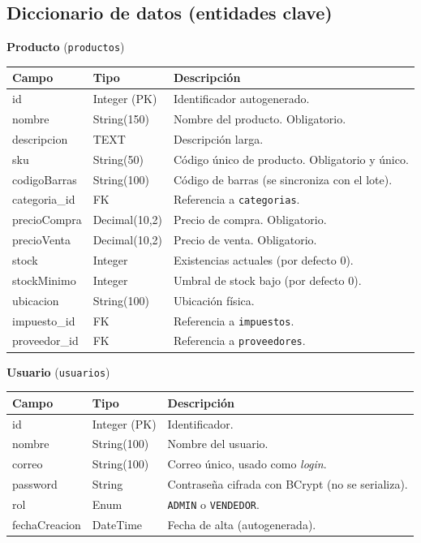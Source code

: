 \documentclass[11pt,a4paper]{article}
\begin{document}
\subsection{Diccionario de datos (entidades clave)}

\textbf{Producto} (\texttt{productos})
\begin{longtable}{>{\ttfamily}p{3.2cm} p{3.5cm} p{7cm}}
\toprule
\textbf{\normalfont Campo} & \textbf{\normalfont Tipo} & \textbf{\normalfont Descripción} \\
\midrule
\endhead
id & Integer (PK) & Identificador autogenerado. \\
nombre & String(150) & Nombre del producto. Obligatorio. \\
descripcion & TEXT & Descripción larga. \\
sku & String(50) & Código único de producto. Obligatorio y único. \\
codigoBarras & String(100) & Código de barras (se sincroniza con el lote). \\
categoria\_id & FK & Referencia a \texttt{categorias}. \\
precioCompra & Decimal(10,2) & Precio de compra. Obligatorio. \\
precioVenta & Decimal(10,2) & Precio de venta. Obligatorio. \\
stock & Integer & Existencias actuales (por defecto 0). \\
stockMinimo & Integer & Umbral de stock bajo (por defecto 0). \\
ubicacion & String(100) & Ubicación física. \\
impuesto\_id & FK & Referencia a \texttt{impuestos}. \\
proveedor\_id & FK & Referencia a \texttt{proveedores}. \\
\bottomrule
\end{longtable}

\textbf{Usuario} (\texttt{usuarios})
\begin{longtable}{>{\ttfamily}p{3.2cm} p{3.5cm} p{7cm}}
\toprule
\textbf{\normalfont Campo} & \textbf{\normalfont Tipo} & \textbf{\normalfont Descripción} \\
\midrule
\endhead
id & Integer (PK) & Identificador. \\
nombre & String(100) & Nombre del usuario. \\
correo & String(100) & Correo único, usado como \emph{login}. \\
password & String & Contraseña cifrada con BCrypt (no se serializa). \\
rol & Enum & \texttt{ADMIN} o \texttt{VENDEDOR}. \\
fechaCreacion & DateTime & Fecha de alta (autogenerada). \\
\bottomrule
\end{longtable}
\end{document}
